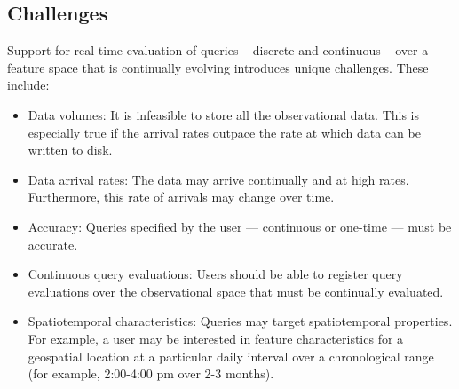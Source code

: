 \subsection{Challenges}
Support for real-time evaluation of queries – discrete and continuous – over a feature space that is continually evolving introduces unique challenges. These include:
\begin{itemize}
\item   Data volumes: It is infeasible to store all the observational data. This is especially true if the arrival rates outpace the rate at which data can be written to disk.
\item   Data arrival rates: The data may arrive continually and at high rates. Furthermore, this rate of arrivals may change over time.
\item   Accuracy: Queries specified by the user — continuous or one-time — must be accurate.
\item   Continuous query evaluations: Users should be able to register query evaluations over the observational space that must be continually evaluated.
\item   Spatiotemporal characteristics: Queries may target spatiotemporal properties. For example, a user may be interested in feature characteristics for a geospatial location at a particular daily interval over a chronological range (for example, 2:00-4:00 pm over 2-3 months).
\end{itemize}

